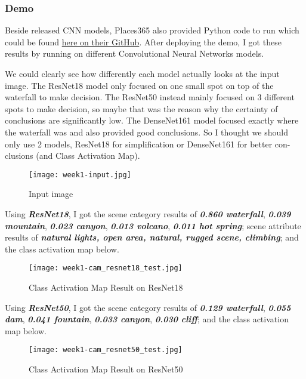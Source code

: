 \subsubsection{Demo}
Beside released CNN models, Places365 also provided Python code to run which could be found \href{https://github.com/CSAILVision/places365}{here on their GitHub}. After deploying the demo, I got these results by running on different Convolutional Neural Networks models.

We could clearly see how differently each model actually looks at the input image. The ResNet18 model only focused on one small spot on top of the waterfall to make decision. The ResNet50 instead mainly focused on 3 different spots to make decision, so maybe that was the reason why the certainty of conclusions are significantly low. The DenseNet161 model focused exactly where the waterfall was and also provided good conclusions. So I thought we should only use 2 models, ResNet18 for simplification or DenseNet161 for better con-clusions (and Class Activation Map).


\begin{figure}[!ht]
\centering
\texttt{[image: week1-input.jpg]}
\caption{Input image}
\end{figure}

Using \textbf{\emph{ResNet18}}, I got the scene category results of \textbf{\emph{0.860 waterfall}}, \textbf{\emph{0.039 mountain}}, \textbf{\emph{0.023 canyon}}, \textbf{\emph{0.013 volcano}}, \textbf{\emph{0.011 hot spring}}; scene attribute results of \textbf{\emph{natural lights, open area, natural, rugged scene, climbing}}; and the class activation map below.

\begin{figure}[!ht]
\centering
\texttt{[image: week1-cam\_resnet18\_test.jpg]}
\caption{Class Activation Map Result on ResNet18}
\end{figure}

Using \textbf{\emph{ResNet50}}, I got the scene category results of \textbf{\emph{0.129 waterfall}}, \textbf{\emph{0.055 dam}}, \textbf{\emph{0.041 fountain}}, \textbf{\emph{0.033 canyon}}, \textbf{\emph{0.030 cliff}}; and the class activation map below.

\begin{figure}[!ht]
\centering
\texttt{[image: week1-cam\_resnet50\_test.jpg]}
\caption{Class Activation Map Result on ResNet50}
\end{figure}

